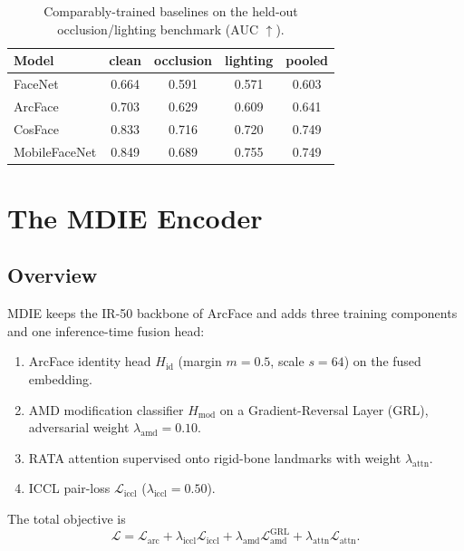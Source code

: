 \documentclass[10pt,conference]{IEEEtran}
\begin{document}
\begin{table}[t]
\centering
\caption{Comparably-trained baselines on the held-out occlusion/lighting
benchmark (AUC $\uparrow$).}
\label{tab:baselines}
\begin{tabular}{lcccc}
\toprule
Model & clean & occlusion & lighting & pooled \\
\midrule
FaceNet        & 0.664 & 0.591 & 0.571 & 0.603 \\
ArcFace        & 0.703 & 0.629 & 0.609 & 0.641 \\
CosFace        & 0.833 & 0.716 & 0.720 & 0.749 \\
MobileFaceNet  & 0.849 & 0.689 & 0.755 & 0.749 \\
\bottomrule
\end{tabular}
\end{table}

\section{The MDIE Encoder}
\label{sec:method}

\subsection{Overview}
MDIE keeps the IR-50 backbone of ArcFace and adds three training components and
one inference-time fusion head:
\begin{enumerate}
\item ArcFace identity head $H_{\text{id}}$ (margin $m\!=\!0.5$, scale
      $s\!=\!64$) on the fused embedding.
\item AMD modification classifier $H_{\text{mod}}$ on a Gradient-Reversal
      Layer (GRL), adversarial weight $\lambda_{\text{amd}}\!=\!0.10$.
\item RATA attention supervised onto rigid-bone landmarks with weight
      $\lambda_{\text{attn}}$.
\item ICCL pair-loss $\mathcal{L}_{\text{iccl}}$ ($\lambda_{\text{iccl}}\!=\!0.50$).
\end{enumerate}
The total objective is
\begin{equation}
\mathcal{L} = \mathcal{L}_{\text{arc}}
            + \lambda_{\text{iccl}}\mathcal{L}_{\text{iccl}}
            + \lambda_{\text{amd}}\mathcal{L}_{\text{amd}}^{\text{GRL}}
            + \lambda_{\text{attn}}\mathcal{L}_{\text{attn}}.
\end{equation}
\end{document}
